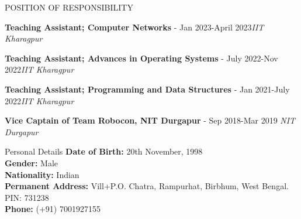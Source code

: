 \documentclass{resume} %
\begin{document}
	\begin{rSection}{POSITION OF RESPONSIBILITY}
		
		{\bf Teaching Assistant; Computer Networks} - Jan 2023-April 2023\hfill {\em IIT Kharagpur}
		
		{\bf Teaching Assistant; Advances in Operating Systems} - July 2022-Nov 2022\hfill {\em IIT Kharagpur}
		
		{\bf Teaching Assistant; Programming and Data Structures} - Jan 2021-July 2022\hfill {\em IIT Kharagpur} 
		
			{\bf Vice Captain of Team Robocon, NIT Durgapur} - Sep 2018-Mar 2019 \hfill {\em NIT Durgapur} 
		
		
	\end{rSection}
	
	\begin{rSection}{Personal Details}
		\textbf{Date of Birth:} 20th November, 1998 \\
		\textbf{Gender:} Male \\ 
		\textbf{Nationality:} Indian\\
		\textbf{Permanent Address:} Vill+P.O. Chatra, Rampurhat, Birbhum, West Bengal. PIN: 731238\\
		\textbf{Phone:} (+91) 7001927155
		
	\end{rSection}
	
\end{document}
